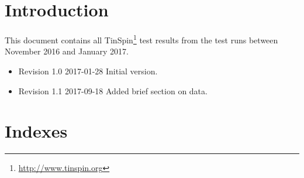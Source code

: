 \documentclass{vldb}
\makeatletter
\def\doi#1{\gdef\@doi{#1}}\def\@doi{}
\makeatother
\begin{document}
\date{17 January 2017}






\maketitle

\section{Introduction}

This document contains all TinSpin\footnote{\url{http://www.tinspin.org}} test results from the test runs between November 2016 and January 2017.

\begin{itemize}
	\item Revision 1.0 2017-01-28 Initial version.
	\item Revision 1.1 2017-09-18 Added brief section on data.
\end{itemize}

\section{Indexes}
\end{document}
